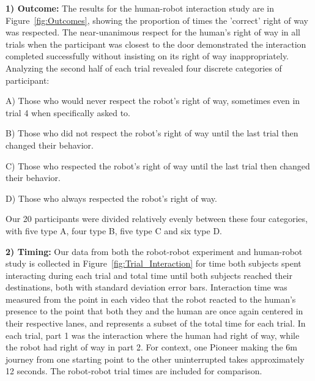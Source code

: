 \documentclass[letterpaper, 10 pt, conference]{ieeeconf}  %
\begin{document}
\textbf{1) Outcome:} The results for the human-robot interaction study are in Figure~\ref{fig:Outcomes}, showing the proportion of times the 'correct' right of way was respected. The near-unanimous respect for the human's right of way in all trials when the participant was closest to the door demonstrated the interaction completed successfully without insisting on its right of way inappropriately. Analyzing the second half of each trial revealed four discrete categories of participant: 

A) Those who would never respect the robot's right of way, sometimes even in trial 4 when specifically asked to. 

B) Those who did not respect the robot's right of way until the last trial then changed their behavior. 

C) Those who respected the robot's right of way until the last trial then changed their behavior. 

D) Those who always respected the robot's right of way. 

Our 20 participants were divided relatively evenly between these four categories, with five type A, four type B, five type C and six type D.

\textbf{2) Timing:} Our data from both the robot-robot experiment and human-robot study is collected in Figure~\ref{fig:Trial_Interaction} for time both subjects spent interacting during each trial and total time until both subjects reached their destinations, both with standard deviation error bars. Interaction time was measured from the point in each video that the robot reacted to the human's presence to the point that both they and the human are once again centered in their respective lanes, and represents a subset of the total time for each trial. In each trial, part 1 was the interaction where the human had right of way, while the robot had right of way in part 2. For context, one Pioneer making the 6m journey from one starting point to the other uninterrupted takes approximately 12 seconds. The robot-robot trial times are included for comparison.  

\end{document}
